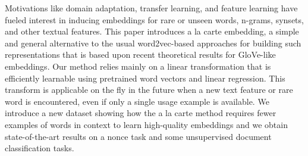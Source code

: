 Motivations like domain adaptation, transfer learning, and feature learning have fueled interest in inducing embeddings for rare or unseen words, n-grams, synsets, and other textual features. This paper introduces a la carte embedding, a simple and general alternative to the usual word2vec-based approaches for building such representations that is based upon recent theoretical results for GloVe-like embeddings. Our method relies mainly on a linear transformation that is efficiently learnable using pretrained word vectors and linear regression. This transform is applicable on the fly in the future when a new text feature or rare word is encountered, even if only a single usage example is available. We introduce a new dataset showing how the a la carte method requires fewer examples of words in context to learn high-quality embeddings and we obtain state-of-the-art results on a nonce task and some unsupervised document classification tasks.
